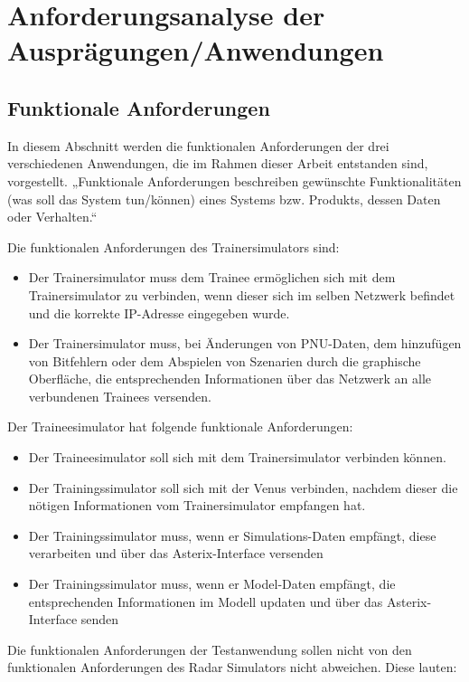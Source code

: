 \section{Anforderungsanalyse der Ausprägungen/Anwendungen}
\subsection{Funktionale Anforderungen}

In diesem Abschnitt werden die funktionalen Anforderungen der drei verschiedenen Anwendungen, die im Rahmen dieser Arbeit entstanden sind, vorgestellt.
„Funktionale Anforderungen beschreiben gewünschte Funktionalitäten (was soll das System tun/können) eines Systems bzw. Produkts, dessen Daten oder 
Verhalten.“

Die funktionalen Anforderungen des Trainersimulators sind:

\begin{itemize}
    \item Der Trainersimulator muss dem Trainee ermöglichen sich mit dem Trainersimulator zu verbinden, wenn dieser sich im selben Netzwerk befindet und
     die korrekte IP-Adresse eingegeben wurde.
    \item Der Trainersimulator muss, bei Änderungen von PNU-Daten, dem hinzufügen von Bitfehlern oder dem Abspielen von Szenarien durch die graphische 
    Oberfläche, die entsprechenden Informationen über das Netzwerk an alle verbundenen Trainees versenden.
\end{itemize}

Der Traineesimulator hat folgende funktionale Anforderungen:

\begin{itemize}
    \item Der Traineesimulator soll sich mit dem Trainersimulator verbinden können.
    \item Der Trainingssimulator soll sich mit der Venus verbinden, nachdem dieser die nötigen Informationen vom Trainersimulator empfangen hat.
    \item Der Trainingssimulator muss, wenn er Simulations-Daten empfängt, diese verarbeiten und über das Asterix-Interface versenden
    \item Der Trainingssimulator muss, wenn er Model-Daten empfängt, die entsprechenden Informationen im Modell updaten und über das Asterix-Interface
     senden
\end{itemize}

Die funktionalen Anforderungen der Testanwendung sollen nicht von den funktionalen Anforderungen des Radar Simulators nicht abweichen. Diese lauten:

